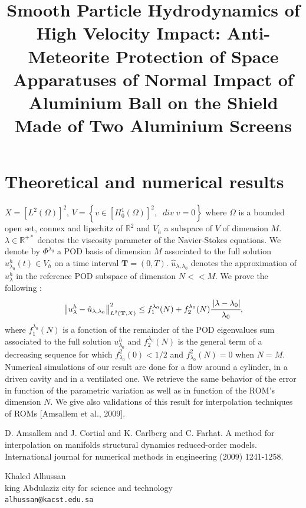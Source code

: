 \documentclass[article,A4,11pt]{llncs}%
\begin{document}
\section*{Theoretical and numerical results}
\vspace{-0.26cm}
$X=[L^{2}(\Omega)]^{2}$,  $V=\left\{v\in[H^{1}_{0}(\Omega)]^{2},\;\; div\;v=0\right\}$ where $\Omega$ is a bounded open set, connex and lipschitz of $\mathbb{R}^{2}$  and $V_h$ a subspace of $V$ of dimension $M$. $\lambda\in\mathbb{R}^{+*}$ denotes the viscosity parameter of the Navier-Stokes equations. We denote by $\Phi^{\lambda_0}$ a POD basis of dimension $M$ associated to the full solution $u^{h}_{\lambda_0}(t)\in V_h$ on a time interval $\textbf{T}=(0,T)$. $\hat{u}_{\lambda,\lambda_0}$ denotes the approximation of $u^{h}_{\lambda}$ in the reference POD subspace of dimension $N<<M$. We prove the following :
$$\left\|u^{h}_{\lambda}-\hat{u}_{\lambda,\lambda_0}\right\|^{2}_{L^{2}(\textbf{T},X)}\leq f^{\lambda_0}_{1}(N)+f^{\lambda_0}_{2}(N)\cfrac{\left|\lambda-\lambda_0\right|}{\lambda_0},$$
where $f^{\lambda_0}_{1}(N)$ is a fonction of the remainder of the POD eigenvalues sum associated to the full solution $u^{h}_{\lambda_0}$ and $f^{\lambda_0}_{2}(N)$ is the general term of a decreasing sequence for which $f^{2}_{\lambda_0}(0)<1/2$ and $f^{2}_{\lambda_0}(N)=0$ when $N=M$.\\
Numerical simulations of our result are done for a flow around a cylinder, in a driven cavity and in a ventilated one. We retrieve the same behavior of the error in function of the parametric variation as well as in function of the ROM's dimension $N$. We give also validations of this result for interpolation techniques of ROMs [Amsallem et al., 2009].         



\begin{thebibliography}{10}
{\sc D. Amsallem and J. Cortial and K. Carlberg and C. Farhat}. {A method for interpolation on manifolds structural dynamics reduced-order models}. International journal for numerical methods in engineering (2009) 1241-1258.
\end{thebibliography}

\title{Smooth Particle Hydrodynamics of High Velocity Impact: Anti-Meteorite Protection of Space Apparatuses of Normal Impact of Aluminium Ball on the Shield Made of Two Aluminium Screens}
 \author{} \institute{}
\maketitle
\begin{center}
{\large Khaled Alhussan}\\
king Abdulaziz city for science and technology\\
{\tt alhussan@kacst.edu.sa}
\end{center}
\end{document}
